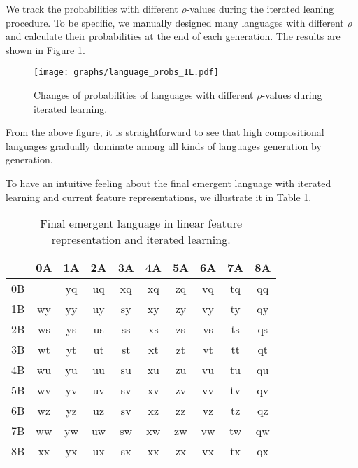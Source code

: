 We track the probabilities with different $\rho$-values during the iterated leaning procedure. To be specific, we manually designed many languages with different $\rho$ and calculate their probabilities at the end of each generation. The results are shown in Figure \ref{fig4.6:lan_prob_IL}.

\begin{figure}[!h]
    \centering
    \texttt{[image: graphs/language\_probs\_IL.pdf]}
    \caption{Changes of probabilities of languages with different $\rho$-values during iterated learning.}
    \label{fig4.6:lan_prob_IL}
\end{figure}

From the above figure, it is straightforward to see that high compositional languages gradually dominate among all kinds of languages generation by generation. 

To have an intuitive feeling about the final emergent language with iterated learning and current feature representations, we illustrate it in Table \ref{tab4.6:emregent_language_referential_perfect}. 

\begin{table}[!h]
    \centering
    \begin{tabular}{|c|c|c|c|c|c|c|c|c|c|}
        \hline
           & 0A & 1A & 2A & 3A & 4A & 5A & 6A & 7A & 8A \\ \hline
        0B &    & yq & uq & xq & xq & zq & vq & tq & qq \\ \hline
        1B & wy & yy & uy & sy & xy & zy & vy & ty & qy \\ \hline
        2B & ws & ys & us & ss & xs & zs & vs & ts & qs \\ \hline
        3B & wt & yt & ut & st & xt & zt & vt & tt & qt \\ \hline
        4B & wu & yu & uu & su & xu & zu & vu & tu & qu \\ \hline
        5B & wv & yv & uv & sv & xv & zv & vv & tv & qv \\ \hline
        6B & wz & yz & uz & sv & xz & zz & vz & tz & qz \\ \hline
        7B & ww & yw & uw & sw & xw & zw & vw & tw & qw \\ \hline
        8B & xx & yx & ux & sx & xx & zx & vx & tx & qx \\ \hline
        \end{tabular}
    \caption{Final emergent language in linear feature representation and iterated learning.}
    \label{tab4.6:emregent_language_referential_perfect}
\end{table}

